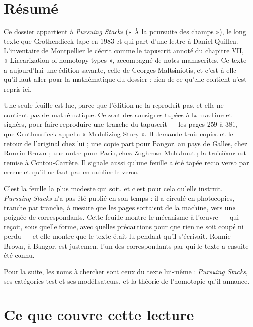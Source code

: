 \documentclass[11pt,a4paper]{article}
\begin{document}
\section*{Résumé}

\begin{resume}
Ce dossier appartient à \emph{Pursuing Stacks} (« À la poursuite des
champs »), le long texte que Grothendieck tape en 1983 et qui part d'une
lettre à Daniel Quillen. L'inventaire de Montpellier le décrit comme le
tapuscrit annoté du chapitre VII, « Linearization of homotopy types »,
accompagné de notes manuscrites. Ce texte a aujourd'hui une édition savante,
celle de Georges Maltsiniotis, et c'est à elle qu'il faut aller pour la
mathématique du dossier : rien de ce qu'elle contient n'est repris ici.

Une seule feuille est lue, parce que l'édition ne la reproduit pas, et elle
ne contient pas de mathématique. Ce sont des consignes tapées à la machine et
signées, pour faire reproduire une tranche du tapuscrit --- les pages 259 à
381, que Grothendieck appelle « Modelizing Story ». Il demande trois copies
et le retour de l'original chez lui ; une copie part pour Bangor, au pays de
Galles, chez Ronnie Brown ; une autre pour Paris, chez Zoghman Mebkhout ; la
troisième est remise à Contou-Carrère. Il signale aussi qu'une feuille a été
tapée recto verso par erreur et qu'il ne faut pas en oublier le verso.

C'est la feuille la plus modeste qui soit, et c'est pour cela qu'elle
instruit. \emph{Pursuing Stacks} n'a pas été publié en son temps : il a
circulé en photocopies, tranche par tranche, à mesure que les pages sortaient
de la machine, vers une poignée de correspondants. Cette feuille montre le
mécanisme à l'œuvre --- qui reçoit, sous quelle forme, avec quelles
précautions pour que rien ne soit coupé ni perdu --- et elle montre que le
texte était lu pendant qu'il s'écrivait. Ronnie Brown, à Bangor, est
justement l'un des correspondants par qui le texte a ensuite été connu.

Pour la suite, les noms à chercher sont ceux du texte lui-même :
\emph{Pursuing Stacks}, ses catégories test et ses modélisateurs, et la
théorie de l'homotopie qu'il annonce.

\end{resume}

\section*{Ce que couvre cette lecture}
\end{document}
